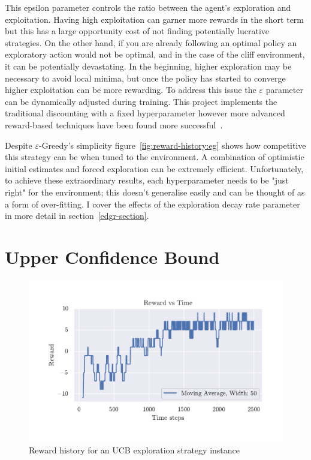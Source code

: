 \documentclass[]{final_report}
\begin{document}
This epsilon parameter controls the ratio between the agent's exploration and exploitation. Having high exploitation can garner more rewards in the short term but this has a large opportunity cost of not finding potentially lucrative strategies. On the other hand, if you are already following an optimal policy an exploratory action would not be optimal, and in the case of the cliff environment, it can be potentially devastating. In the beginning, higher exploration may be necessary to avoid local minima, but once the policy has started to converge higher exploitation can be more rewarding. To address this issue the $\varepsilon$ parameter can be dynamically adjusted during training. This project implements the traditional discounting with a fixed hyperparameter however more advanced reward-based techniques have been found more successful~\cite{rewardEpsilonDecay}.

Despite $\varepsilon$-Greedy's simplicity figure~\ref{fig:reward-history:eg} shows how competitive this strategy can be when tuned to the environment. A combination of optimistic initial estimates and forced exploration can be extremely efficient. Unfortunately, to achieve these extraordinary results, each hyperparameter needs to be "just right" for the environment; this doesn't generalise easily and can be thought of as a form of over-fitting. I cover the effects of the exploration decay rate parameter in more detail in section~\ref{edgr-section}.


\section{Upper Confidence Bound}

\begin{figure}[H]
  \centering
  
  \includegraphics[trim={0 1cm 0 1cm},clip,width=\textwidth]{reward-history/UCB.pdf}
  
  \caption{\label{fig:reward-history:ucb} Reward history for an UCB exploration strategy instance}
\end{figure}
\end{document}
